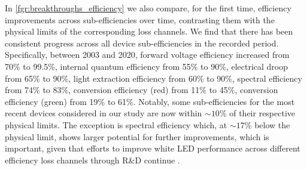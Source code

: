 \documentclass[parskip=full]{article}
\begin{document}
In \cref{fgr:breakthroughs_efficiency} we also compare, for the first time, efficiency improvements across sub-efficiencies over time, contrasting them with the physical limits of the corresponding loss channels. We find that there has been consistent progress across all device sub-efficiencies in the recorded period. Specifically, between 2003 and 2020, forward voltage efficiency increased from 70\% to 99.5\%, internal quantum efficiency from 55\% to 90\%, electrical droop from 65\% to 90\%, light extraction efficiency from 60\% to 90\%, spectral efficiency from 74\% to 83\%, conversion efficiency (red) from 11\% to 45\%, conversion efficiency (green) from 19\% to 61\%. Notably, some sub-efficiencies for the most recent devices considered in our study are now within $\sim10\%$ of their respective physical limits. The exception is spectral efficiency which, at $\sim17\%$ below the physical limit, shows larger potential for further improvements, which is important, given that efforts to improve white LED performance across different efficiency loss channels through R\&D continue \cite{cho2017white, Weisbuch2020}. 
\end{document}
